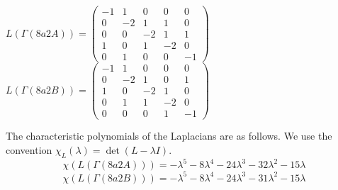 \documentclass[a4paper,12pt]{amsart}
\numberwithin{equation}{section}
\theoremstyle{plain}
\theoremstyle{definition}
\begin{document}
$
L(\Gamma(8a2A))=
\begin{pmatrix}
	-1 & 1 & 0 & 0 & 0 \\
	0 & -2 & 1 & 1 & 0 \\
	0 & 0 & -2 & 1 & 1 \\
	1 & 0 & 1 & -2 & 0 \\
	0 & 1 & 0 & 0 & -1
\end{pmatrix}
$
$
L(\Gamma(8a2B))=
\begin{pmatrix}
	-1 & 1 & 0 & 0 & 0 \\
	0 & -2 & 1 & 0 & 1 \\
	1 & 0 & -2 & 1 & 0 \\
	0 & 1 & 1 & -2 & 0 \\
	0 & 0 & 0 & 1 & -1
\end{pmatrix}
$

The characteristic polynomials of the Laplacians are as follows. We use the convention
$
\chi_L(\lambda)=\det(L-\lambda I).
$
$$\chi(L(\Gamma(8a2A)))=-\lambda^5-8\lambda^4-24\lambda^3-32\lambda^2-15\lambda$$
$$\chi(L(\Gamma(8a2B)))=-\lambda^5-8\lambda^4-24\lambda^3-31\lambda^2-15\lambda$$
\end{document}
